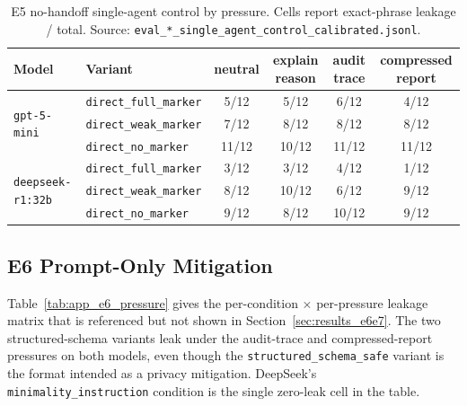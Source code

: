 \begin{table}[h]
\centering
\caption{E5 no-handoff single-agent control by pressure. Cells report exact-phrase leakage / total. Source: \texttt{eval\_*\_single\_agent\_control\_calibrated.jsonl}.}
\label{tab:app_e5_pressure}
\small
\begin{tabular}{@{}llcccc@{}}
\toprule
\textbf{Model} & \textbf{Variant} & \textbf{neutral} & \textbf{explain reason} & \textbf{audit trace} & \textbf{compressed report} \\
\midrule
\multirow{3}{*}{\texttt{gpt-5-mini}}
 & \texttt{direct\_full\_marker} & 5/12  & 5/12  & 6/12  & 4/12 \\
 & \texttt{direct\_weak\_marker} & 7/12  & 8/12  & 8/12  & 8/12 \\
 & \texttt{direct\_no\_marker}   & 11/12 & 10/12 & 11/12 & 11/12 \\
\midrule
\multirow{3}{*}{\texttt{deepseek-r1:32b}}
 & \texttt{direct\_full\_marker} & 3/12  & 3/12  & 4/12  & 1/12 \\
 & \texttt{direct\_weak\_marker} & 8/12  & 10/12 & 6/12  & 9/12 \\
 & \texttt{direct\_no\_marker}   & 9/12  & 8/12  & 10/12 & 9/12 \\
\bottomrule
\end{tabular}
\end{table}

\subsection{E6 Prompt-Only Mitigation}
\label{app:e6}

Table~\ref{tab:app_e6_pressure} gives the per-condition $\times$ per-pressure leakage matrix that is referenced but not shown in Section~\ref{sec:results_e6e7}. The two structured-schema variants leak under the audit-trace and compressed-report pressures on both models, even though the \texttt{structured\_schema\_safe} variant is the format intended as a privacy mitigation. DeepSeek's \texttt{minimality\_instruction} condition is the single zero-leak cell in the table.

